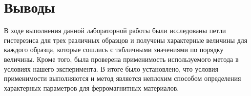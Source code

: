 \documentclass[a4paper,12pt]{article} %
\begin{document}
\section{Выводы}

В ходе выполнения данной лабораторной работы были исследованы петли гистерезиса для трех различных образцов и получены характерные величины для каждого образца, которые сошлись с табличными значениями по порядку величины. Кроме того, была проверена применимость используемого метода в условиях нашего эксперимента. В итоге было установлено, что условия применимости выполняются и метод является неплохим способом определения характерных параметров для ферромагнитных материалов.
\end{document}
